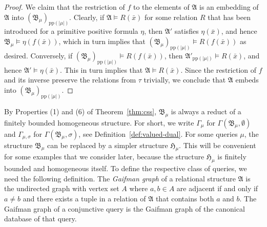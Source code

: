 \documentclass[nonacm]{acmart}
\newcommand{\bA}{{\mathfrak A}}
\newcommand{\bB}{{\mathfrak B}}
\newcommand{\bH}{{\mathfrak H}}
\begin{document}
\begin{proof}
We claim that the restriction of $f$ to the elements of $\bA$ is an embedding of $\bA$ into $(\bB_\mu)_{\text{pp}(|\mu|)}$. Clearly, if $\bA \models R(\bar x)$ for some relation $R$ that has been introduced for a primitive positive formula $\eta$, then $\bA'$ satisfies $\eta(\bar x)$, 
and hence $\bB_\mu \models \eta(f(\bar x))$, which in turn implies that
$(\bB_\mu)_{\text{pp}(|\mu|)} \models R(f(\bar x))$ as desired. 
Conversely, if $(\bB_\mu)_{\text{pp}(|\mu|)} \models R(f(\bar x))$, then
$\bA'_{\text{pp}(|\mu|)} \models R(\bar x)$, and hence $\bA' \models \eta(\bar x)$. 
This in turn implies that $\bA \models R(\bar x)$.
Since the restriction of $f$ and its inverse preserve the relations from $\tau$ trivially, we conclude that $\bA$ embeds into $(\bB_\mu)_{\text{pp}(|\mu|)}$.
\end{proof}


By Properties (1) and (6) of Theorem~\ref{thm:css}, $\bB_\mu$ is always a reduct of a finitely bounded homogeneous structure. For short, we write $\Gamma_\mu$ for $\Gamma(\bB_\mu, \emptyset)$ and $\Gamma_{\mu,\sigma}$ for $\Gamma(\bB_\mu, \sigma)$, see Definition~\ref{def:valued-dual}.
%
For some queries $\mu$, the structure $\bB_\mu$ can be replaced by a simpler structure $\bH_\mu$. This will be 
convenient for some examples that we consider later, because the structure $\bH_\mu$ is finitely bounded and homogeneous itself.
To define the respective class of queries, we need the following definition. The \emph{Gaifman graph} of a 
relational structure $\bA$ 
is the undirected graph with vertex set $A$ where $a,b \in A$ are adjacent if and only if $a \neq b$ and there exists a tuple in a relation of $\bA$ that contains both $a$ and $b$. The Gaifman graph of a conjunctive query is the Gaifman graph of the canonical database of that query.
\end{document}
